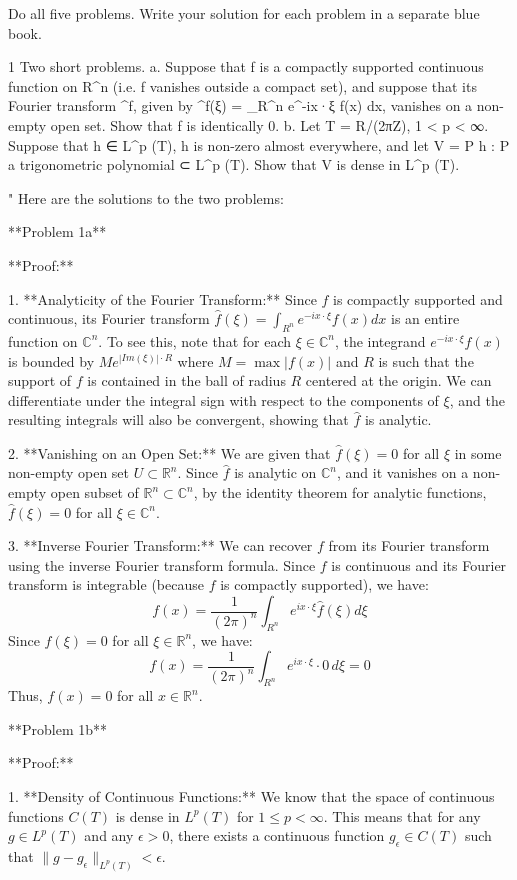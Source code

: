 Do all five problems. Write your solution for each problem in a separate blue book.

1 Two short problems.
a. Suppose that f is a compactly supported continuous function on R^n (i.e. f vanishes outside a compact set), and suppose that its Fourier transform ^f, given by ^f(ξ) = \int_{R^n} e^{-ix·ξ} f(x) dx, vanishes on a non-empty open set. Show that f is identically 0.
b. Let T = R/(2πZ), 1 < p < ∞. Suppose that h ∈ L^p (T), h is non-zero almost everywhere, and let V = {P h : P a trigonometric polynomial} ⊂ L^p (T). Show that V is dense in L^p (T).

"
Here are the solutions to the two problems:

**Problem 1a**

**Proof:**

1.  **Analyticity of the Fourier Transform:** Since $f$ is compactly supported and continuous, its Fourier transform $\hat{f}(\xi) = \int_{R^n} e^{-ix \cdot \xi} f(x) dx$ is an entire function on $\mathbb{C}^n$. To see this, note that for each $\xi \in \mathbb{C}^n$, the integrand $e^{-ix \cdot \xi} f(x)$ is bounded by $M e^{|Im(\xi)| \cdot R}$ where $M = \max |f(x)|$ and $R$ is such that the support of $f$ is contained in the ball of radius $R$ centered at the origin. We can differentiate under the integral sign with respect to the components of $\xi$, and the resulting integrals will also be convergent, showing that $\hat{f}$ is analytic.

2.  **Vanishing on an Open Set:** We are given that $\hat{f}(\xi) = 0$ for all $\xi$ in some non-empty open set $U \subset \mathbb{R}^n$. Since $\hat{f}$ is analytic on $\mathbb{C}^n$, and it vanishes on a non-empty open subset of $\mathbb{R}^n \subset \mathbb{C}^n$, by the identity theorem for analytic functions, $\hat{f}(\xi) = 0$ for all $\xi \in \mathbb{C}^n$.

3.  **Inverse Fourier Transform:** We can recover $f$ from its Fourier transform using the inverse Fourier transform formula. Since $f$ is continuous and its Fourier transform is integrable (because $f$ is compactly supported), we have:
    $$f(x) = \frac{1}{(2\pi)^n} \int_{R^n} e^{ix \cdot \xi} \hat{f}(\xi) d\xi$$
    Since $\hat{f}(\xi) = 0$ for all $\xi \in \mathbb{R}^n$, we have:
    $$f(x) = \frac{1}{(2\pi)^n} \int_{R^n} e^{ix \cdot \xi} \cdot 0 \, d\xi = 0$$
    Thus, $f(x) = 0$ for all $x \in \mathbb{R}^n$.

**Problem 1b**

**Proof:**

1.  **Density of Continuous Functions:** We know that the space of continuous functions $C(T)$ is dense in $L^p(T)$ for $1 \le p < \infty$. This means that for any $g \in L^p(T)$ and any $\epsilon > 0$, there exists a continuous function $g_\epsilon \in C(T)$ such that $\|g - g_\epsilon\|_{L^p(T)} < \epsilon$.

